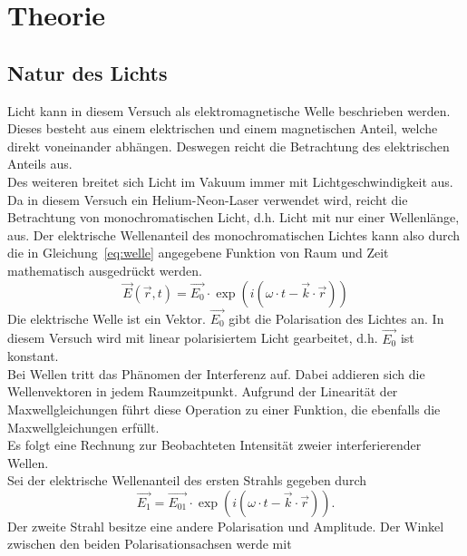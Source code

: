 

\section{Theorie}
\subsection{Natur des Lichts}
%
Licht kann in diesem Versuch als elektromagnetische Welle 
beschrieben werden.\\
Dieses besteht aus einem elektrischen und einem magnetischen Anteil, 
welche direkt voneinander abhängen. Deswegen reicht die Betrachtung 
des elektrischen Anteils aus.\\
Des weiteren breitet sich Licht im Vakuum immer mit 
Lichtgeschwindigkeit aus.\\
Da in diesem Versuch ein Helium-Neon-Laser verwendet wird, 
reicht die Betrachtung von monochromatischen Licht, d.h. Licht 
mit nur einer Wellenlänge, aus. Der elektrische Wellenanteil des 
monochromatischen Lichtes kann also durch die in 
Gleichung~\eqref{eq:welle} angegebene Funktion von 
Raum und Zeit mathematisch ausgedrückt werden.
%
\begin{equation}
\vec{E}(\vec{r},t) = \vec{E_0}\cdot \exp{(i(\omega\cdot t - 
\vec{k}\cdot \vec{r}))}
\label{eq:welle}
\end{equation}
%
Die elektrische Welle ist ein Vektor.
$\vec{E_0}$ gibt die Polarisation des Lichtes an. In diesem Versuch 
wird mit linear polarisiertem Licht gearbeitet, d.h. $\vec{E_0}$ ist 
konstant.\\
Bei Wellen tritt das Phänomen der Interferenz auf. Dabei 
addieren sich die Wellenvektoren in jedem Raumzeitpunkt.
Aufgrund der Linearität der Maxwellgleichungen führt diese Operation 
zu einer Funktion, die ebenfalls die Maxwellgleichungen erfüllt.\\
Es folgt eine Rechnung zur Beobachteten Intensität zweier 
interferierender Wellen.\\
Sei der elektrische Wellenanteil des ersten Strahls gegeben durch
\begin{equation}
\vec{E_1} = \vec{E_{01}}\cdot \exp{(i(\omega\cdot t - 
\vec{k}\cdot \vec{r}))}.
\end{equation}
Der zweite Strahl besitze eine andere Polarisation und Amplitude.
Der Winkel zwischen den beiden Polarisationsachsen werde mit 

